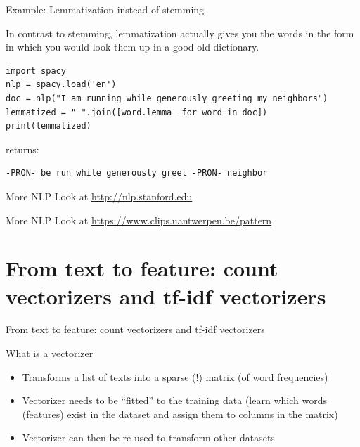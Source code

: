 \documentclass{beamer}
\begin{document}
\begin{frame}[fragile]{Example: Lemmatization instead of stemming}

In contrast to stemming, lemmatization actually gives you the words in the form in which you would look them up in a good old dictionary.

\begin{lstlisting}
import spacy
nlp = spacy.load('en')
doc = nlp("I am running while generously greeting my neighbors")
lemmatized = " ".join([word.lemma_ for word in doc])
print(lemmatized)
\end{lstlisting}

returns:

\begin{lstlisting}
-PRON- be run while generously greet -PRON- neighbor
\end{lstlisting}  

\end{frame}



\begin{frame}{More NLP}
\Huge{Look at \url{http://nlp.stanford.edu}}
\end{frame}


\begin{frame}{More NLP}
\Huge{Look at \url{https://www.clips.uantwerpen.be/pattern}}
\end{frame}






	
\section{From text to feature: count vectorizers and tf-idf vectorizers}
\begin{frame}[plain]
From text to feature: count vectorizers and tf-idf vectorizers
\end{frame}	



\begin{frame}{What is a vectorizer}
\begin{itemize}[<+->]
	\item Transforms a list of texts into a sparse (!) matrix (of word frequencies)
	\item Vectorizer needs to be ``fitted'' to the training data (learn which words (features) exist in the dataset and assign them to columns in the matrix)
	\item Vectorizer can then be re-used to transform other datasets 
\end{itemize}
\end{frame}
\end{document}
